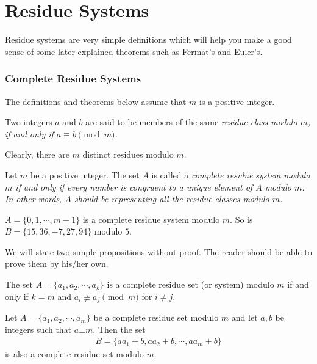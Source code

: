 \documentclass{subfile}
\begin{document}
	\section{Residue Systems}
	Residue systems are very simple definitions which will help you make a good sense of some later-explained theorems such as Fermat's and Euler's.
	\subsubsection{Complete Residue Systems}
	The definitions and theorems below assume that $m$ is a positive integer.
		\begin{definition}
			Two integers $a$ and $b$ are said to be members of the same \slshape{residue class} modulo $m$, if and only if $a \equiv b \pmod m$.
		\end{definition}
		
		Clearly, there are $m$ distinct residues modulo $m$.
		
		\begin{definition}\label{def:completeresiduesystem}
			Let $m$ be a positive integer. The set $A$ is called a \slshape{complete residue system modulo $m$} if and only if every number is congruent to a unique element of $A$ modulo $m$. In other words, $A$ should be representing all the residue classes modulo $m$.
		\end{definition}
		
		\begin{example}
			$A = \{0,1, \cdots, m-1\}$ is a complete residue system modulo $m$. So is $B=\{15, 36, -7, 27, 94\}$ modulo $5$.
		\end{example}
	We will state two simple propositions without proof. The reader should be able to prove them by his/her own.
	
	\begin{proposition}
		The set $A=\{a_1, a_2, \cdots, a_k\}$ is a complete residue set (or system) modulo $m$ if and only if $k=m$ and $a_i \not\equiv a_j \pmod m$ for $i \neq j$.
	\end{proposition}
	
	\begin{proposition} \label{prop:generalcompletesystem}
		Let $A=\{a_1, a_2, \cdots, a_m\}$ be a complete residue set modulo $m$ and let $a,b$ be integers such that $a \bot m$. Then the set
		\begin{align*}
			B=\{aa_1+b, aa_2+b, \cdots, aa_m+b\}
		\end{align*}
		is also a complete residue set modulo $m$.
	\end{proposition}
	
\end{document}
